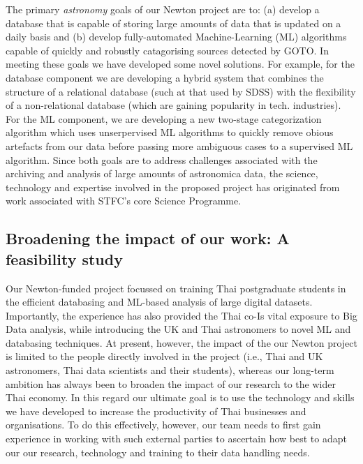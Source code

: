 \documentclass[11pt]{article}
\begin{document}
\vspace{2mm}
\noindent
The primary {\it astronomy} goals of our Newton project are to: (a) develop a database that is capable of storing large amounts of data that is updated on a daily basis and (b) develop fully-automated Machine-Learning (ML) algorithms capable of quickly and robustly catagorising sources detected by GOTO. In meeting these goals we have developed some novel solutions. For example, for the database component we are developing a hybrid system that combines the structure of a relational database (such at that used by SDSS) with the flexibility of a non-relational database (which are gaining popularity in tech. industries). For the ML component, we are developing a new two-stage categorization algorithm which uses unserpervised ML algorithms to quickly remove obious artefacts from our data before passing more ambiguous cases to a supervised ML algorithm. Since both goals are to address challenges associated with the archiving and analysis of large amounts of astronomica data, the science, technology and expertise involved in the proposed project has originated from work associated with STFC's core Science Programme. 

\subsection{Broadening the impact of our work: A feasibility study}
Our Newton-funded project focussed on training Thai postgraduate students in the efficient databasing and ML-based analysis of large digital datasets. Importantly, the experience has also provided the Thai co-Is vital exposure to Big Data analysis, while introducing the UK and Thai astronomers to novel ML and databasing techniques. At present, however, the impact of the our Newton project is limited to the people directly involved in the project (i.e., Thai and UK astronomers, Thai data scientists and their students), whereas our long-term ambition has always been to broaden the impact of our research to the wider Thai economy. In this regard our ultimate goal is to use the technology and skills we have developed to increase the productivity of Thai businesses and organisations. To do this effectively, however, our team needs to first gain experience in working with such external parties to ascertain how best to adapt our our research, technology and training to their data handling needs.  
\end{document}
